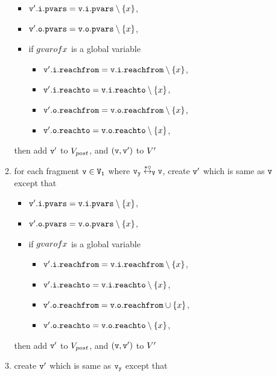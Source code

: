 \begin{itemize}
\begin{enumerate}
\begin{itemize}
\item $\mathtt{v}'.\mathtt{i}.\mathtt{pvars} = \mathtt{v}.\mathtt{i}.\mathtt{pvars} \setminus \left\{x\right\}$,
\item $\mathtt{v}'.\mathtt{o}.\mathtt{pvars} = \mathtt{v}.\mathtt{o}.\mathtt{pvars} \setminus \left\{x\right\}$,
\item if $\\gvarof{x}$ is a global variable
\begin{itemize}
\item $\mathtt{v}'.\mathtt{i}.\mathtt{reachfrom} = \mathtt{v}.\mathtt{i}.\mathtt{reachfrom} \setminus \left\{x\right\}$,
\item $\mathtt{v}'.\mathtt{i}.\mathtt{reachto} = \mathtt{v}.\mathtt{i}.\mathtt{reachto} \setminus \left\{x\right\}$,
\item $\mathtt{v}'.\mathtt{o}.\mathtt{reachfrom} = \mathtt{v}.\mathtt{o}.\mathtt{reachfrom} \setminus \left\{x\right\}$,
\item $\mathtt{v}'.\mathtt{o}.\mathtt{reachto} = \mathtt{v}.\mathtt{o}.\mathtt{reachto} \setminus \left\{x\right\}$,
\end{itemize}
\end{itemize}
then add $\tt v'$ to $V_{post}$, and $\tt (v,v')$ to $V'$
\item for each fragment $\tt v \in V_1$ where $\tt \mathtt{v}_y \overset{*\circ}\leftrightarrow_{V} v$, create $\tt v'$ which is same as $\tt v$ except that
\begin{itemize}
\item $\mathtt{v}'.\mathtt{i}.\mathtt{pvars} = \mathtt{v}.\mathtt{i}.\mathtt{pvars} \setminus \left\{x\right\}$,
\item $\mathtt{v}'.\mathtt{o}.\mathtt{pvars} = \mathtt{v}.\mathtt{o}.\mathtt{pvars} \setminus \left\{x\right\}$,
\item if $\\gvarof{x}$ is a global variable
\begin{itemize}
\item $\mathtt{v}'.\mathtt{i}.\mathtt{reachfrom} = \mathtt{v}.\mathtt{i}.\mathtt{reachfrom} \setminus \left\{x\right\}$,
\item $\mathtt{v}'.\mathtt{i}.\mathtt{reachto} = \mathtt{v}.\mathtt{i}.\mathtt{reachto} \setminus \left\{x\right\}$,
\item $\mathtt{v}'.\mathtt{o}.\mathtt{reachfrom} = \mathtt{v}.\mathtt{o}.\mathtt{reachfrom} \cup \left\{x\right\}$,
\item $\mathtt{v}'.\mathtt{o}.\mathtt{reachto} = \mathtt{v}.\mathtt{o}.\mathtt{reachto} \setminus \left\{x\right\}$,
\end{itemize}
\end{itemize}
then add $\tt v'$ to $V_{post}$, and $\tt (v,v')$ to $V'$
\item create $\tt v'$ which is same as $\tt \mathtt{v}_y$ except that
\begin{itemize}

\end{itemize}
\end{enumerate}
\end{itemize}
